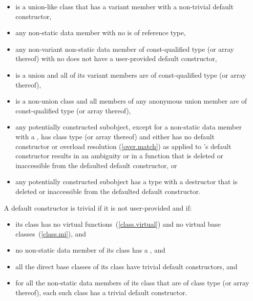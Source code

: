 \begin{itemize}
\item {} is a union-like class that has a variant
  member with a non-trivial default constructor,

\item any non-static data member with no  is of reference type,

\item any non-variant non-static data member of const-qualified type (or array
thereof) with no  does not have a user-provided default constructor,

\item {} is a union and all of its variant members are of const-qualified
type (or array thereof),

\item {} is a non-union class and all members of any anonymous union member are
of const-qualified type (or array thereof),

\item any potentially constructed subobject, except for a non-static data member
with a , has
class type  (or array thereof) and either 
has no default constructor or overload resolution
(\ref{over.match}) as applied to 's default
constructor results in an ambiguity or in a function that is deleted or
inaccessible from the defaulted default constructor, or

\item any potentially constructed subobject has a type
with a destructor that is deleted or inaccessible from the defaulted default
constructor.
\end{itemize}

A default constructor is
trivial
if it is not user-provided and if:

\begin{itemize}
\item
its class has no virtual functions~(\ref{class.virtual}) and no virtual base
classes~(\ref{class.mi}), and

\item no non-static data member of its class has a , and

\item
all the direct base classes of its class have trivial default constructors, and

\item
for all the non-static data members of its class that are of class
type (or array thereof), each such class has a trivial default constructor.
\end{itemize}

